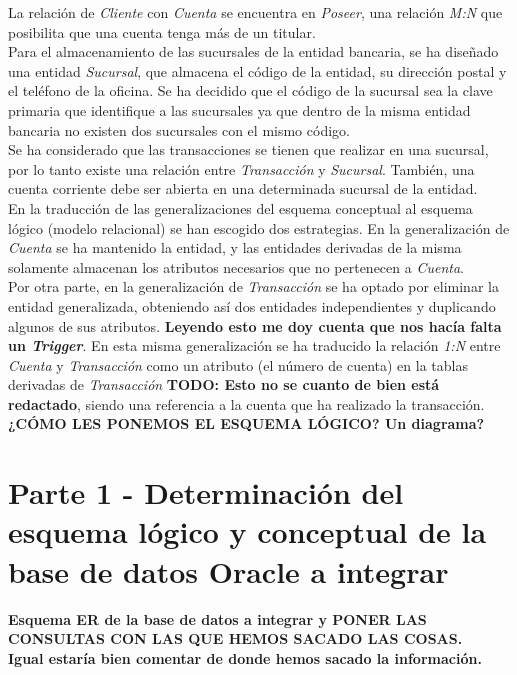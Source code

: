 \documentclass{article}
\begin{document}
La relación de \emph{Cliente} con \emph{Cuenta} se encuentra en \emph{Poseer}, una relación \emph{M:N} que posibilita que una cuenta tenga más de un titular.\\
Para el almacenamiento de las sucursales de la entidad bancaria, se ha diseñado una entidad \emph{Sucursal}, que almacena el código de la entidad, su dirección postal y el teléfono de la oficina. Se ha decidido que el código de la sucursal sea la clave primaria que identifique a las sucursales ya que dentro de la misma entidad bancaria no existen dos sucursales con el mismo código.\\
Se ha considerado que las transacciones se tienen que realizar en una sucursal, por lo tanto existe una relación entre \emph{Transacción} y \emph{Sucursal}. También, una cuenta corriente debe ser abierta en una determinada sucursal de la entidad.\\

En la traducción de las generalizaciones del esquema conceptual al esquema lógico (modelo relacional) se han escogido dos estrategias. En la generalización de \emph{Cuenta} se ha mantenido la entidad, y las entidades derivadas de la misma solamente almacenan los atributos necesarios que no pertenecen a \emph{Cuenta}.\\
Por otra parte, en la generalización de \emph{Transacción} se ha optado por eliminar la entidad generalizada, obteniendo así dos entidades independientes y duplicando algunos de sus atributos. \textbf{Leyendo esto me doy cuenta que nos hacía falta un \emph{Trigger}}. En esta misma generalización se ha traducido la relación \emph{1:N} entre \emph{Cuenta} y \emph{Transacción} como un atributo (el número de cuenta) en la tablas derivadas de \emph{Transacción} \textbf{TODO: Esto no se cuanto de bien está redactado}, siendo una referencia a la cuenta que ha realizado la transacción.\\
{\LARGE \textbf{¿CÓMO LES PONEMOS EL ESQUEMA LÓGICO? Un diagrama?}}

\section{Parte 1 - Determinación del esquema lógico y conceptual de la base de datos Oracle a integrar}

\textbf{Esquema ER de la base de datos a integrar y PONER LAS CONSULTAS CON LAS QUE HEMOS SACADO LAS COSAS.}\\
\textbf{Igual estaría bien comentar de donde hemos sacado la información.}
\end{document}
